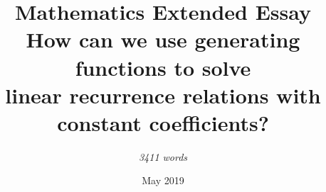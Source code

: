 \documentclass[a4paper, 12pt]{report}
\title{
    { \textbf{Mathematics Extended Essay}}\\
    \bigskip
    {\Large How can we use generating functions to solve\\  linear recurrence relations with constant coefficients?}
}
\author{\textit{3411 words}}
\date{May 2019}
\begin{document}
\onehalfspacing
\allowdisplaybreaks
\maketitle




\end{document}
